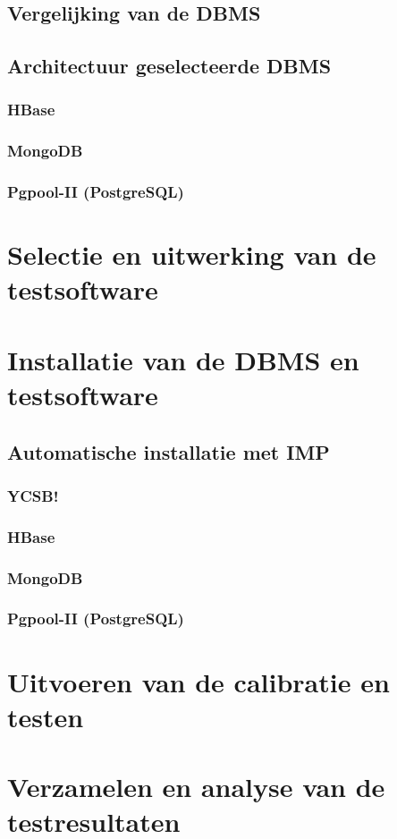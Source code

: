 \subsection{Vergelijking van de DBMS}

\subsection{Architectuur geselecteerde DBMS}
\subsubsection{HBase}
\subsubsection{MongoDB}
\subsubsection{Pgpool-II (PostgreSQL)}

\section{Selectie en uitwerking van de testsoftware}


\section{Installatie van de DBMS en testsoftware}

\subsection{Automatische installatie met IMP}

\subsubsection{YCSB!}
\subsubsection{HBase}
\subsubsection{MongoDB}
\subsubsection{Pgpool-II (PostgreSQL)}

\section{Uitvoeren van de calibratie en testen}

\section{Verzamelen en analyse van de testresultaten}
